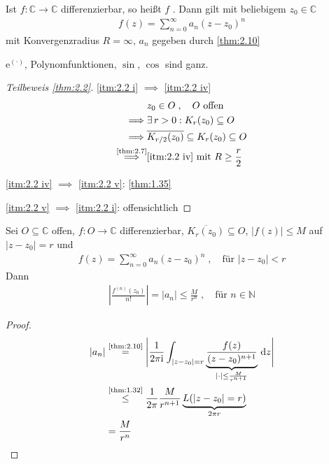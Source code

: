 \documentclass[a4paper,10pt]{scrbook}
\begin{document}
\begin{theorem}[Definition] \label{thm:2.11}
  Ist $f:\mathbb{C} \to \mathbb{C}$ differenzierbar, so heißt $f$ . Dann gilt mit beliebigem $z_0 \in \mathbb{C}$
  \begin{align*}
    f(z) = \sum\limits_{n=0}^{\infty} a_n (z-z_0)^n
  \end{align*}
  mit Konvergenzradius $R = \infty$, $a_n$ gegeben durch \ref{thm:2.10}
\end{theorem}

\begin{example}
  $\mathrm{e}^{(\cdot)}$, Polynomfunktionen, $\sin$, $\cos$ sind ganz.
\end{example}

\begin{proof}[Teilbeweis \ref{thm:2.2}]
  \ref{itm:2.2 i} $\implies$ \ref{itm:2.2 iv}
  \begin{align*}
    & z_0 \in O \; , \quad O \text{ offen} \\
    \implies& \exists \, r > 0 : K_r(z_0) \subseteq O \\
    \implies& \overline{K_{r/2}(z_0)} \subseteq K_r(z_0) \subseteq O \\
    \overset{\text{\ref{thm:2.7}}}{\implies}& \text{\ref{itm:2.2 iv}} \text{ mit } R \geq \frac{r}{2}
  \end{align*}

  \ref{itm:2.2 iv} $\implies$ \ref{itm:2.2 v}: \ref{thm:1.35}

  \ref{itm:2.2 v} $\implies$ \ref{itm:2.2 i}: offensichtlich
\end{proof}

\begin{theorem} \label{thm:2.13}
  Sei $O \subseteq \mathbb{C}$ offen, $f:O \to \mathbb{C}$ differenzierbar, $\overline{K_r(z_0)} \subseteq O$, $|f(z)| \leq M$ auf $|z-z_0| = r$ und
  \begin{align*}
    f(z) = \sum\limits_{n=0}^{\infty} a_n (z-z_0)^n \; , \quad \text{für } |z-z_0| < r
  \end{align*}
  Dann
  \begin{align*}
    \left| \frac{f^{(n)}(z_0)}{n!} \right| = |a_n| \leq \frac{M}{r^n} \; , \quad \text{für } n \in \mathbb{N}
  \end{align*}

  \begin{proof}
    \begin{align*}
      |a_n| &\overset{\text{\ref{thm:2.10}}}{=} \Bigg| \frac{1}{2 \pi \mathrm{i}} \int_{|z-z_0| = r} \underbrace{\frac{f(z)}{(z-z_0)^{n+1}}}_{|\cdot| \leq \frac{M}{r^{n+1}}} \, \mathrm{d}z \Bigg| \\
      &\overset{\text{\ref{thm:1.32}}}{\leq} \frac{1}{2 \pi} \frac{M}{r^{n+1}} \underbrace{L(|z-z_0| = r)}_{2 \pi r} \\
      &= \frac{M}{r^n}
    \end{align*}
  \end{proof}
\end{theorem}
\end{document}
